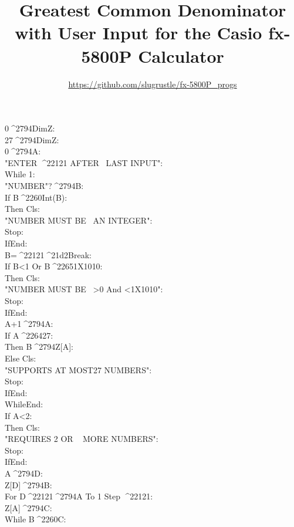 \documentclass[11pt,letterpaper,twocolumn]{article}
\date{}
\newcommand{\STO}{{\large ^^^^2794}}
\newcommand{\CBR}{{\Large ^^^^21d2}}
\newcommand{\NEQ}{^^^^2260}
\newcommand{\LEQ}{^^^^2264}
\newcommand{\GEQ}{^^^^2265}
\newcommand{\MINUS}{^^^^2212}
\newcommand{\EXPTEN}{{\scriptsize X10}}
\newcommand{\IDENT}[1]{\hspace*{#1\BaseIndent}}
\begin{document}
\pagestyle{empty}
\title{Greatest Common Denominator with User Input for the Casio fx-5800P Calculator}
\author{\url{https://github.com/slugrustle/fx-5800P_progs}}
\maketitle
\thispagestyle{empty}
\begin{linenumbers}
0\STO DimZ:\\
27\STO DimZ:\\
0\STO A:\\
"ENTER \MINUS 1 AFTER ~LAST INPUT":\\
While 1:\\
\IDENT{1}"NUMBER"?\STO B:\\
\IDENT{1}If B\NEQ Int(B):\\
\IDENT{2}Then Cls:\\
\IDENT{2}"NUMBER MUST BE ~AN INTEGER":\\
\IDENT{2}Stop:\\
\IDENT{1}IfEnd:\\
\IDENT{1}B=\MINUS 1\CBR Break:\\
\IDENT{1}If B<1 Or B\GEQ 1\EXPTEN 10:\\
\IDENT{2}Then Cls:\\
\IDENT{2}"NUMBER MUST BE ~>0 And <1\EXPTEN 10":\\
\IDENT{2}Stop:\\
\IDENT{1}IfEnd:\\
\IDENT{1}A+1\STO A:\\
\IDENT{1}If A\LEQ 27:\\
\IDENT{2}Then B\STO Z[A]:\\
\IDENT{1}Else Cls:\\
\IDENT{2}"SUPPORTS AT MOST27 NUMBERS":\\
\IDENT{2}Stop:\\
\IDENT{1}IfEnd:\\
WhileEnd:\\
If A<2:\\
\IDENT{1}Then Cls:\\
\IDENT{1}"REQUIRES 2 OR ~ MORE NUMBERS":\\
\IDENT{1}Stop:\\
IfEnd:\\
A\STO D:\\
Z[D]\STO B:\\
For D\MINUS 1\STO A To 1 Step \MINUS 1:\\
\IDENT{1}Z[A]\STO C:\\
\IDENT{1}While B\NEQ C:\\

\end{linenumbers}
\end{document}
